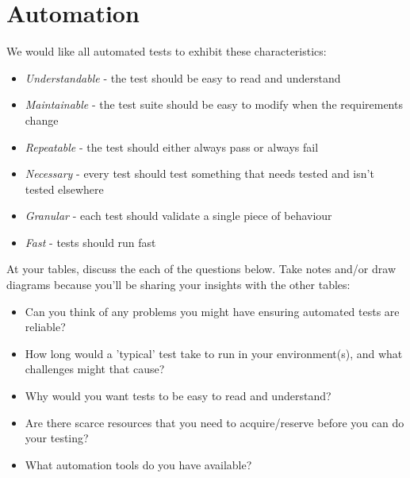 \chapter*{Automation}

We would like all automated tests to exhibit these characteristics:

\begin{itemize}
    \item \emph{Understandable} - the test should be easy to read and understand
    \item \emph{Maintainable} - the test suite should be easy to modify when the requirements change
    \item \emph{Repeatable} - the test should either always pass or always fail
    \item \emph{Necessary} - every test should test something that needs tested and isn't tested elsewhere
    \item \emph{Granular} - each test should validate a single piece of behaviour
    \item \emph{Fast} - tests should run fast
\end{itemize}

At your tables, discuss the each of the questions below. Take notes and/or draw diagrams because you'll be sharing your insights with the other tables:

\begin{itemize}
    \item Can you think of any problems you might have ensuring automated tests are reliable?
    \item How long would a 'typical' test take to run in your environment(s), and what challenges might that cause?
    \item Why would you want tests to be easy to read and understand?
    \item Are there scarce resources that you need to acquire/reserve before you can do your testing?
    \item What automation tools do you have available?
\end{itemize}



